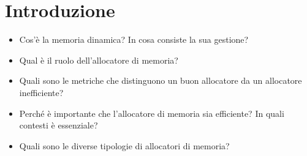 \chapter{Introduzione}
\begin{itemize}
  \item Cos’è la memoria dinamica? In cosa consiste la sua gestione?
  \item Qual è il ruolo dell’allocatore di memoria?
  \item Quali sono le metriche che distinguono un buon allocatore da un allocatore inefficiente?
  \item Perché è importante che l’allocatore di memoria sia efficiente? In quali contesti è essenziale?
  \item Quali sono le diverse tipologie di allocatori di memoria?
\end{itemize}